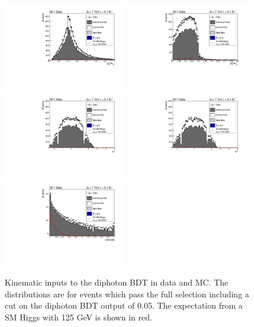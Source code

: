 \begin{figure}[hbt!]
  \includegraphics[width=0.48\textwidth]{hgg7TeV/variablePlots/pt_1om}
  \includegraphics[width=0.48\textwidth]{hgg7TeV/variablePlots/pt_2om}\\
  \includegraphics[width=0.48\textwidth]{hgg7TeV/variablePlots/phoeta_1}
  \includegraphics[width=0.48\textwidth]{hgg7TeV/variablePlots/phoeta_2}\\
  \includegraphics[width=0.48\textwidth]{hgg7TeV/variablePlots/cosdphi}
 \caption{Kinematic inputs to the diphoton BDT in data and MC. 
	  The distributions are for events which pass the full selection 
	  including a cut on the diphoton BDT output of 0.05.
 	  The expectation from a SM Higgs with 125 GeV is shown in red.}
 \label{fig:diphotonbdtvars1}
\end{figure}

